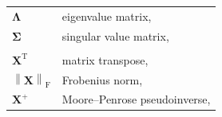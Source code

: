 \documentclass[11pt,a4paper]{book}
\begin{document}
{\begin{minipage}[t]{.5\linewidth}
\begin{tabular}{ll}
      $\mathbf \Lambda$ & eigenvalue matrix,
      \pageref{eq:eigenvalue-decomposition} \\ 
      $\mathbf \Sigma$ & singular value
      matrix, \pageref{eq:singular-value-decomposition} \\  
      \\
      $\mathbf X^{\mathrm T}$ & matrix transpose,
      \pageref{eq:matrix-transpose} \\ 
      $\left\| \mathbf X \right\|_{\mathrm F}$ & Frobenius norm,
      \pageref{eq:frobenius-norm} \\ 
      $\mathbf X^+$ & Moore--Penrose pseudoinverse,
      \pageref{para:pseudoinverse} \\ 
    \end{tabular}
  \end{minipage}
}

\ifdefined\printversion
  
\fi
\end{document}
